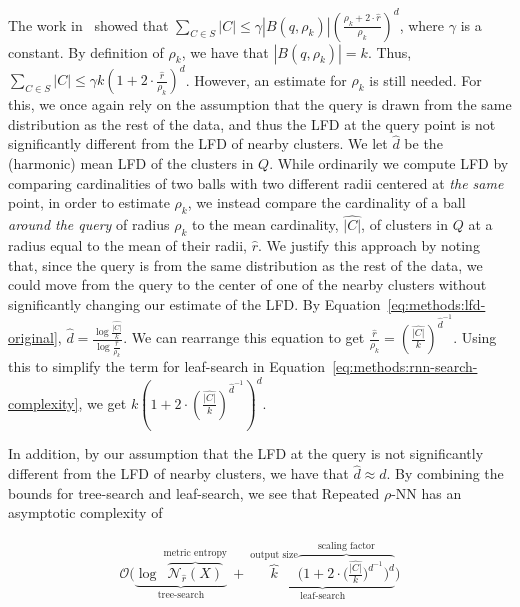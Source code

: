 The work in~\cite{yu2015entropy} showed that $\sum_{C \in S} |C| \leq \gamma  \left| B(q, \rho_k) \right| \left(\frac{\rho_k + 2 \cdot \hat{r}}{\rho_k} \right)^d$, where $\gamma$ is a constant.
By definition of $\rho_k$, we have that $|B(q, \rho_k)| = k$.
Thus, $\sum_{C \in S} |C| \leq \gamma k \left( 1 + 2 \cdot \frac{\hat{r}}{\rho_k} \right)^d$.
However, an estimate for $\rho_k$ is still needed.
For this, we once again rely on the assumption that the query is drawn from the same distribution as the rest of the data, and thus the LFD at the query point is not significantly different from the LFD of nearby clusters.
We let $\hat{d}$ be the (harmonic) mean LFD of the clusters in $Q$.
While ordinarily we compute LFD by comparing cardinalities of two balls with two different radii centered at \textit{the same} point, in order to estimate $\rho_k$, we instead compare the cardinality of a ball \textit{around the query} of radius $\rho_k$ to the mean cardinality, $\hat{|C|}$, of clusters in $Q$ at a radius equal to the mean of their radii, $\hat{r}$.
We justify this approach by noting that, since the query is from the same distribution as the rest of the data, we could move from the query to the center of one of the nearby clusters without significantly changing our estimate of the LFD.
By Equation~\ref{eq:methods:lfd-original}, $\hat{d} = \frac{\log{}\frac{\hat{|C|}}{k}}{\log{}\frac{\hat{r}}{\rho_k}}$.
We can rearrange this equation to get $\frac{\hat{r}}{\rho_k} = \left( \frac{\hat{|C|}}{k} \right)^{\hat{d}^{-1}}$.
Using this to simplify the term for leaf-search in Equation~\ref{eq:methods:rnn-search-complexity}, we get $k \left( 1 + 2 \cdot \left( \frac{\hat{|C|}}{k} \right) ^ {\hat{d}^{-1}} \right)^d$.

In addition, by our assumption that the LFD at the query is not significantly different from the LFD of nearby clusters, we have that $\hat{d} \approx d$.
By combining the bounds for tree-search and leaf-search, we see that Repeated $\rho$-NN has an asymptotic complexity of

\begin{gather}
    \mathcal{O}
    \Bigg(
        \underbrace{
            \log~\overbrace{\mathcal{N}_{\hat{r}}(X)}^{\textrm{metric entropy}}
        }_{\textrm{tree-search}}
        \ + \
        \underbrace{
            \overbrace{k}^{\textrm{output size}}
            \overbrace{\bigg( 1 + 2 \cdot \Big( \frac{\hat{|C|}}{k} \Big) ^ {d^{-1}} \bigg)^d}^{\textrm{scaling factor}}
        }_{\textrm{leaf-search}}
    \Bigg)
    \label{eq:methods:repeated-rnn-complexity}
\end{gather}

